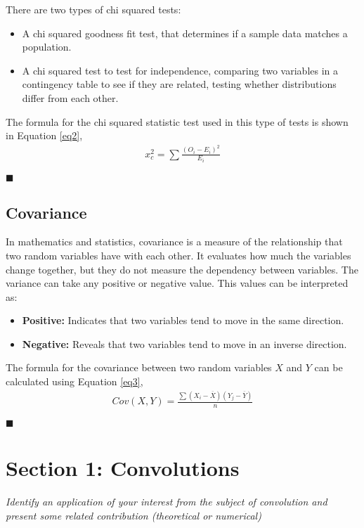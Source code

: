 \documentclass{article}
\begin{document}
There are two types of chi squared tests:

\begin{itemize}
\item A chi squared goodness fit test, that determines if a sample data matches a population.
\item A chi squared test to test for independence, comparing two variables in a contingency table to see if they are related, testing whether distributions differ from each other.
\end{itemize}

The formula for the chi squared statistic test used in this type of tests is shown in Equation \ref{eq2}, 
 \begin{eqnarray}
\label{eq2}
x_{c}^2 = \sum \frac{(O_i - E_i)^2}{E_i}
\end{eqnarray}

\begin{flushright}
$\blacksquare$
\end{flushright}

\subsection{Covariance}

In mathematics and statistics, covariance is a measure of the relationship that two random variables have with each other. It evaluates how much the variables change together, but they do not measure the dependency between variables. The variance can take any positive or negative value. This values can be interpreted as:

\begin{itemize}
\item \textbf{Positive:} Indicates that two variables tend to move in the same direction.
\item \textbf{Negative:} Reveals that two variables tend to move in an inverse direction.
\end{itemize}

The formula for the covariance between two random variables $X$ and $Y$ can be calculated using  Equation \ref{eq3}, 
 \begin{eqnarray}
\label{eq3}
Cov(X,Y) =  \frac{\sum(X_i - \overline{X})(Y_j - \overline{Y})}{n}
\end{eqnarray}

\begin{flushright}
$\blacksquare$
\end{flushright}


\section{Section 1: Convolutions}
\textit{Identify an application of your interest from the subject of convolution and present some related contribution (theoretical or numerical) }\\
\end{document}
